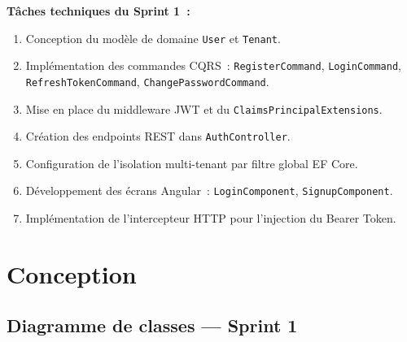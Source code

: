 \documentclass[12pt,a4paper]{report}
\begin{document}
\noindent\textbf{Tâches techniques du Sprint 1~:}
\begin{enumerate}[noitemsep]
  \item Conception du modèle de domaine \texttt{User} et \texttt{Tenant}.
  \item Implémentation des commandes CQRS~: \texttt{RegisterCommand}, \texttt{LoginCommand},
    \texttt{RefreshTokenCommand}, \texttt{ChangePasswordCommand}.
  \item Mise en place du middleware JWT et du \texttt{ClaimsPrincipalExtensions}.
  \item Création des endpoints REST dans \texttt{AuthController}.
  \item Configuration de l'isolation multi-tenant par filtre global EF Core.
  \item Développement des écrans Angular~: \texttt{LoginComponent}, \texttt{SignupComponent}.
  \item Implémentation de l'intercepteur HTTP pour l'injection du Bearer Token.
\end{enumerate}

\section{Conception}

\subsection{Diagramme de classes — Sprint 1}
\end{document}
